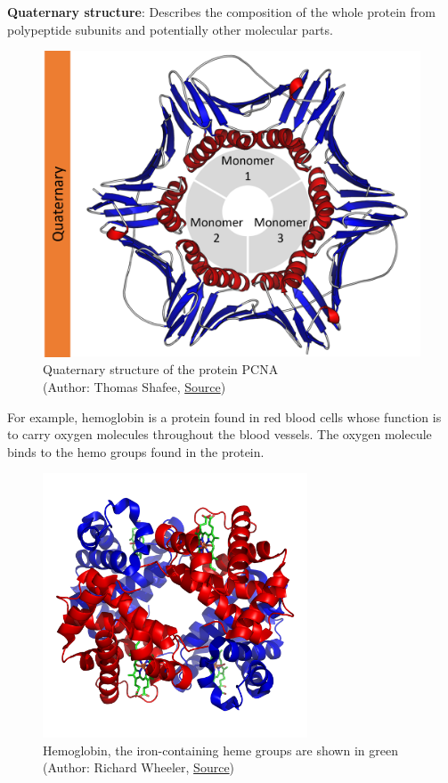 \textbf{Quaternary structure}: Describes the composition of the whole protein from polypeptide subunits and potentially other molecular parts.

\begin{figure}[H]
    \centering
    \includegraphics[width=\textwidth]{figures/bioinformatics/protein_structure_quaternary.png}
    \caption{Quaternary structure of the protein PCNA\\(Author: Thomas Shafee, \href{https://en.wikipedia.org/wiki/File:Protein\_structure\_(full).png}{Source})}
\end{figure}

For example, hemoglobin is a protein found in red blood cells whose function is to carry oxygen molecules throughout the blood vessels. The oxygen molecule binds to the hemo groups found in the protein.

\begin{figure}[H]
    \centering
    \includegraphics[width=0.7\textwidth]{figures/bioinformatics/hemoglobin.png}
    \caption{Hemoglobin, the iron-containing heme groups are shown in green \\(Author: Richard Wheeler, \href{https://en.wikipedia.org/wiki/File:1GZX\_Haemoglobin.png}{Source})}
\end{figure}

